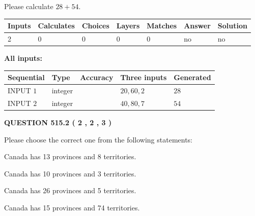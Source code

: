 \documentclass[12pt]{article}
\begin{document}
  
 
Please calculate $ %
28 +  %
54 $.
 
 
   
   
   
   
\noindent\begin{tabular}{|l|l|l|l|l|l|l|}
 \hline
Inputs & Calculates & Choices & Layers & Matches & Answer & Solution \\ \hline
 2  & 
 0  & 
 0
  & 
 0  & 
 0  & 
  no & 
  no 
  \\ \hline
 \end{tabular}
   
   
   
   
\noindent{}
   
   
   
   
\noindent\vspace{0.1in}\hspace{-0.08in} {\textbf{\Large{All inputs: }}}
   
   
  
  
\noindent\begin{tabular}{|l|l|l|l|l|}
\hline
 Sequential & Type & Accuracy & Three inputs & Generated \\ 
\hline
 
 
  INPUT $  1 $ & integer &  & $
 20
 , 
 60
 , 
 2
 $ & $ 28 $ 
 \\  \hline  
 
 
  INPUT $  2 $ & integer &  & $
 40
 , 
 80
 , 
 7
 $ & $ 54 $ 
 \\  \hline  
 \end{tabular}
   
   
  
\vspace{0.2in}
  
{\textbf{\Large{QUESTION
515.2 
 ( 2 , 2 , 3 )
}}}
  
  
Please choose the correct one from the following statements:
 
 
Canada has  13 provinces and  8 territories.
 
 
Canada has 10  provinces and 3 territories.
 
 
Canada has  26 provinces and  5 territories.
 
 
Canada has  15 provinces and  74 territories.
 
\end{document}
